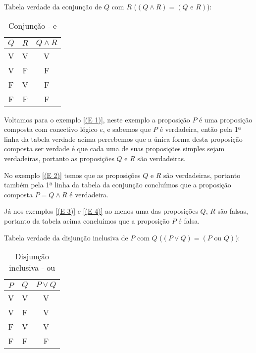  Tabela verdade da conjunção de $Q$ com $R$ ($(Q \land R)= (Q \text{ e } R)$):
  
 \begin{table}[H]
 \centering
 \begin{tabular}{|c|c|c|} \hline
 \rowcolor{cinza}
 $Q$ & $R$ & $Q \land R$ \\ \hline
 V & V & V  \\ \hline
 V & F & F  \\ \hline
 F & V & F  \\ \hline
 F & F & F \\ \hline
 \end{tabular}
 \caption{Conjunção - e}
\end{table}

\begin{exem}
 Voltamos para o exemplo \ref{(E 1)}, neste exemplo a proposição $P$ é uma proposição composta com conectivo lógico $e$, e sabemos que $P$ é verdadeira, então pela 1ª linha da tabela verdade acima percebemos que a única forma desta proposição composta ser verdade é que cada uma de suas proposições simples sejam verdadeiras, portanto as proposições $Q$ e $R$ são verdadeiras.
 
 No exemplo \ref{(E 2)} temos que as proposições $Q$ e $R$ são verdadeiras, portanto também pela 1ª linha da tabela da conjunção concluímos que a proposição composta $P= Q \land R$ é verdadeira.
 
 Já nos exemplos \ref{(E 3)} e \ref{(E 4)} ao menos uma das proposições $Q$, $R$ são falsas, portanto da tabela acima concluímos que a proposição $P$ é falsa.
\end{exem}

 
 Tabela verdade da disjunção inclusiva de $P$ com $Q$ ($(P \lor Q)= (P \text{ ou } Q)$): 
 \begin{table}[H]
 \centering
 \begin{tabular}{|c|c|c|} \hline
 \rowcolor{cinza}
 $P$ & $Q$ & $P \lor Q$ \\ \hline
 V & V & V \\ \hline
 V & F & V \\ \hline
 F & V & V \\ \hline
 F & F & F \\ \hline
 \end{tabular}
 \caption{Disjunção inclusiva - ou}
\end{table}

